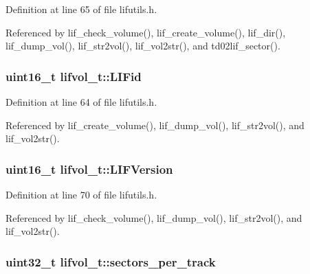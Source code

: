 Definition at line 65 of file lifutils.\+h.



Referenced by lif\+\_\+check\+\_\+volume(), lif\+\_\+create\+\_\+volume(), lif\+\_\+dir(), lif\+\_\+dump\+\_\+vol(), lif\+\_\+str2vol(), lif\+\_\+vol2str(), and td02lif\+\_\+sector().

\subsubsection[{\texorpdfstring{L\+I\+Fid}{LIFid}}]{\setlength{\rightskip}{0pt plus 5cm}uint16\+\_\+t lifvol\+\_\+t\+::\+L\+I\+Fid}\hypertarget{structlifvol__t_adb6a0c2fff5b765eb12c3eb5db6d5bad}{}\label{structlifvol__t_adb6a0c2fff5b765eb12c3eb5db6d5bad}


Definition at line 64 of file lifutils.\+h.



Referenced by lif\+\_\+create\+\_\+volume(), lif\+\_\+dump\+\_\+vol(), lif\+\_\+str2vol(), and lif\+\_\+vol2str().

\subsubsection[{\texorpdfstring{L\+I\+F\+Version}{LIFVersion}}]{\setlength{\rightskip}{0pt plus 5cm}uint16\+\_\+t lifvol\+\_\+t\+::\+L\+I\+F\+Version}\hypertarget{structlifvol__t_afffd824a7b0ce6aa8410fa243733475f}{}\label{structlifvol__t_afffd824a7b0ce6aa8410fa243733475f}


Definition at line 70 of file lifutils.\+h.



Referenced by lif\+\_\+check\+\_\+volume(), lif\+\_\+dump\+\_\+vol(), lif\+\_\+str2vol(), and lif\+\_\+vol2str().

\subsubsection[{\texorpdfstring{sectors\+\_\+per\+\_\+track}{sectors_per_track}}]{\setlength{\rightskip}{0pt plus 5cm}uint32\+\_\+t lifvol\+\_\+t\+::sectors\+\_\+per\+\_\+track}\hypertarget{structlifvol__t_ad245f7419e180934262f53acd9b4349c}{}\label{structlifvol__t_ad245f7419e180934262f53acd9b4349c}


